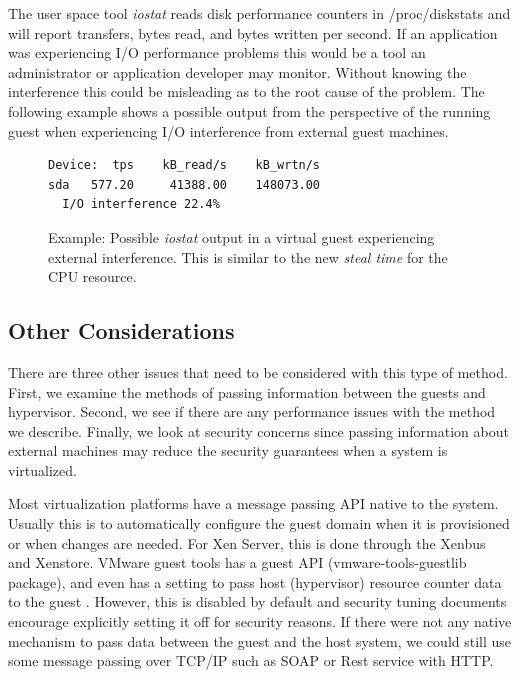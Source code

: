 The user space tool \emph{iostat} reads disk performance counters in /proc/diskstats and will report transfers, bytes read, and bytes written per second.  If an application was experiencing I/O performance problems this would be a tool an administrator or application developer may monitor.  Without knowing the interference this could be misleading as to the root cause of the problem.  The following example shows a possible output from the perspective of the running guest when experiencing I/O interference from external guest machines.

\begin{figure}[h]
\begin{Verbatim}
Device:  tps    kB_read/s    kB_wrtn/s
sda   577.20     41388.00    148073.00
  I/O interference 22.4%     
\end{Verbatim}
\label{fig:iostat}
\caption{Example:  Possible \emph{iostat} output in a virtual guest experiencing external interference.  This is similar to the new \emph{steal time} for the CPU resource.}
\end{figure}

\subsection{Other Considerations}
There are three other issues that need to be considered with this type of method.  First, we examine the methods of passing information between the guests and hypervisor.  Second, we see if there are any performance issues with the method we describe.  Finally, we look at security concerns since passing information about external machines may reduce the security guarantees when a system is virtualized.

Most virtualization platforms have a message passing API native to the system.  Usually this is to automatically configure the guest domain when it is provisioned or when changes are needed.  For Xen Server, this is done through the Xenbus and Xenstore.  VMware guest tools has a guest API (vmware-tools-guestlib package), and even has a setting to pass host (hypervisor) resource counter data to the guest \cite{vmwarepubs}.  However, this is disabled by default and security tuning documents encourage explicitly setting it off for security reasons. If there were not any native mechanism to pass data between the guest and the host system, we could still use some message passing over TCP/IP such as SOAP or Rest service with HTTP.

